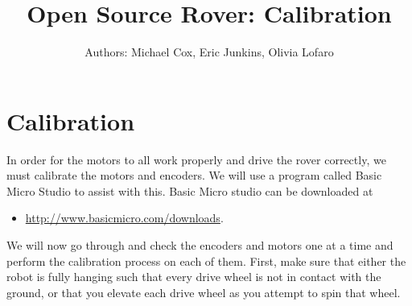 \documentclass[12pt]{article}
\begin{document}
\title{Open Source Rover: Calibration}
\author{Authors: Michael Cox, Eric Junkins, Olivia Lofaro}

\makeatletter         
\def\@maketitle{
\begin{center}	
	\makebox[\textwidth][c]{ \texttt{[image: "Pictures/calibration".png]}}
	{\Huge \bfseries \sffamily \@title }\\[3ex] 
	{\Large \sffamily \@author}\\[3ex] 
	\texttt{[image: "Pictures/JPL logo".png]}
\end{center}}
\makeatother

\maketitle


\newpage


\tableofcontents




\section{Calibration}
\label{cal section}
In order for the motors to all work properly and drive the rover correctly, we must calibrate the motors and encoders. We will use a program called Basic Micro Studio to assist with this. Basic Micro studio can be downloaded at 
\begin{itemize}
	\item \href{http://www.basicmicro.com/downloads}{http://www.basicmicro.com/downloads}. 
\end{itemize}

\noindent We will now go through and check the encoders and motors one at a time and perform the calibration process on each of them. First, make sure that either the robot is fully hanging such that every drive wheel is not in contact with the ground, or that you elevate each drive wheel as you attempt to spin that wheel.
\end{document}
